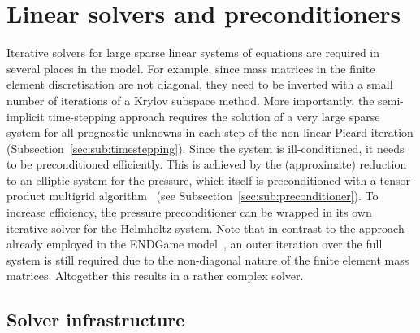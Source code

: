 \documentclass[review,times]{elsarticle}
\begin{document}

\section{\label{sec:Solver}Linear solvers and preconditioners}

Iterative solvers for large sparse linear systems of equations are
required in several places in the model. For example, since mass
matrices in the finite element discretisation are not diagonal, they
need to be inverted with a small number of iterations of a Krylov
subspace method. More importantly, the semi-implicit time-stepping
approach requires the solution of a very large sparse system for all
prognostic unknowns in each step of the non-linear Picard
iteration (Subsection~\ref{sec:sub:timestepping}). 
Since the system is ill-conditioned, it needs to be
preconditioned efficiently. This is achieved by the (approximate)
reduction to an elliptic system for the pressure, which itself is
preconditioned with a tensor-product multigrid algorithm~\cite{Borm2001} 
(see Subsection~\ref{sec:sub:preconditioner}). To increase
efficiency, the pressure preconditioner can be wrapped in its own
iterative solver for the Helmholtz system. Note that in contrast to
the approach already employed in the ENDGame model~\cite{QJ:QJ2235},
an outer iteration over the full system is still required due to the
non-diagonal nature of the finite element mass matrices. Altogether
this results in a rather complex solver.

\subsection{\label{sec:sub:solvinf}Solver infrastructure}
\end{document}
